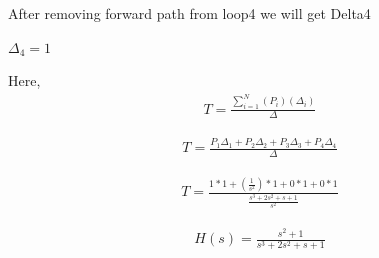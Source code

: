 \begin{enumerate}[label=\thesection.\arabic*.,ref=\thesection.\theenumi]
After removing forward path from loop4 we will get Delta4

$\Delta_4 = 1$

Here, 
\begin{align}
T=\frac{\sum_{i=1}^{N}(P_i)(\Delta_i)}{\Delta}
\end{align}

\begin{align}
T=\frac{P_1 \Delta_1+P_2 \Delta_2+P_3 \Delta_3+P_4 \Delta_4}{\Delta}
\end{align}

\begin{align}
T=\frac{1*1 +(\frac{1}{s^2})*1 + 0*1 + 0*1 }{\frac{s^3+2s^2+s+1}{s^2}}
\end{align}

\begin{align}
H(s)=\frac{s^2+1}{s^3+2s^2+s+1}
\end{align}
\renewcommand{\thefigure}{\theenumi}

\end{enumerate}